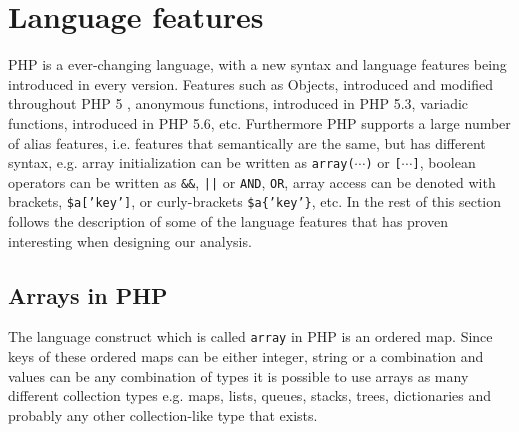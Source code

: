 \section{Language features}
PHP is a ever-changing language, with a new syntax and language features being introduced in every version. Features such as Objects, introduced and modified throughout PHP 5 , anonymous functions, introduced in PHP 5.3, variadic functions, introduced in PHP 5.6, etc. Furthermore PHP supports a large number of alias features, i.e. features that semantically are the same, but has different syntax, e.g. array initialization can be written as \texttt{array($\cdots$)} or \texttt{[$\cdots$]}, boolean operators can be written as \texttt{\&\&}, \texttt{||} or \texttt{AND}, \texttt{OR}, array access can be denoted with brackets, \texttt{\$a['key']}, or curly-brackets \texttt{\$a\{'key'\}}, etc. In the rest of this section follows the description of some of the language features that has proven interesting when designing our analysis.

\subsection{Arrays in PHP}
The language construct which is called \texttt{array} in PHP is an ordered map. Since keys of these ordered maps can be either integer, string or a combination and values can be any combination of types it is possible to use arrays as many different collection types e.g. maps, lists, queues, stacks, trees, dictionaries and probably any other collection-like type that exists.

